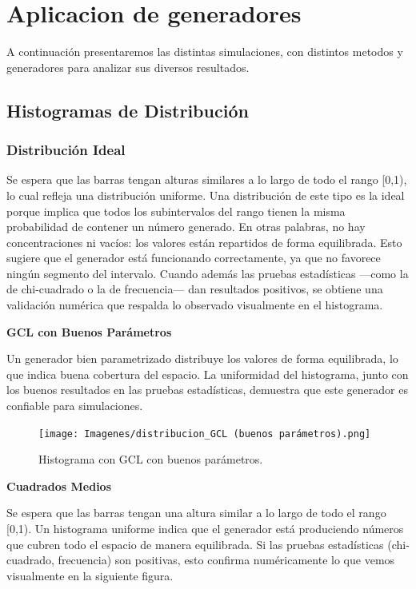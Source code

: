 \documentclass{article}
\begin{document}
\section{Aplicacion de generadores}
A continuación presentaremos las distintas simulaciones, con distintos metodos y generadores para analizar sus diversos resultados.

\subsection{Histogramas de Distribución}

\subsubsection{Distribución Ideal}
Se espera que las barras tengan alturas similares a lo largo de todo el rango [0,1), lo cual refleja una distribución uniforme. Una distribución de este tipo es la ideal porque implica que todos los subintervalos del rango tienen la misma probabilidad de contener un número generado. En otras palabras, no hay concentraciones ni vacíos: los valores están repartidos de forma equilibrada. Esto sugiere que el generador está funcionando correctamente, ya que no favorece ningún segmento del intervalo. Cuando además las pruebas estadísticas —como la de chi-cuadrado o la de frecuencia— dan resultados positivos, se obtiene una validación numérica que respalda lo observado visualmente en el histograma.



\newpage

\textbf{GCL con Buenos Parámetros}

Un generador bien parametrizado distribuye los valores de forma equilibrada, lo que indica buena cobertura del espacio. La uniformidad del histograma, junto con los buenos resultados en las pruebas estadísticas, demuestra que este generador es confiable para simulaciones.

\begin{figure}[H]
\centering
\texttt{[image: Imagenes/distribucion\_GCL (buenos parámetros).png]}
\caption{Histograma con GCL con buenos parámetros.}
\end{figure}
\raggedbottom

\textbf{Cuadrados Medios}

Se espera que las barras tengan una altura similar a lo largo de todo el rango [0,1). 
Un histograma uniforme indica que el generador está produciendo números que cubren todo el espacio de manera equilibrada. Si las pruebas estadísticas (chi-cuadrado, frecuencia) son positivas, esto confirma numéricamente lo que vemos visualmente en la siguiente figura.
\end{document}
